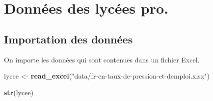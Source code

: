 \documentclass[
]{book}
\newenvironment{Shaded}{\begin{snugshade}}{\end{snugshade}}
\newcommand{\FunctionTok}[1]{\textcolor[rgb]{0.13,0.29,0.53}{\textbf{#1}}}
\newcommand{\NormalTok}[1]{#1}
\newcommand{\OtherTok}[1]{\textcolor[rgb]{0.56,0.35,0.01}{#1}}
\newcommand{\StringTok}[1]{\textcolor[rgb]{0.31,0.60,0.02}{#1}}
\begin{document}
\hypertarget{donnuxe9es-des-lycuxe9es-pro.}{%
\chapter{Données des lycées pro.}\label{donnuxe9es-des-lycuxe9es-pro.}}

\hypertarget{importation-des-donnuxe9es}{%
\section{Importation des données}\label{importation-des-donnuxe9es}}

On importe les données qui sont contenues dans un fichier Excel.

\begin{Shaded}
\begin{Highlighting}[]
\NormalTok{lycee }\OtherTok{\textless{}{-}} \FunctionTok{read\_excel}\NormalTok{(}\StringTok{"data/fr{-}en{-}taux{-}de{-}pression{-}et{-}demploi.xlsx"}\NormalTok{)}
\end{Highlighting}
\end{Shaded}

\begin{Shaded}
\begin{Highlighting}[]
\FunctionTok{str}\NormalTok{(lycee)}
\end{Highlighting}
\end{Shaded}
\end{document}

